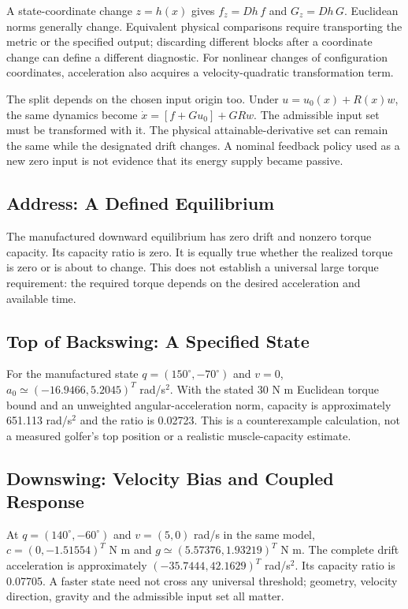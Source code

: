 A state-coordinate change $z=h(x)$ gives $f_z=Dh\,f$ and $G_z=Dh\,G$. Euclidean norms generally change. Equivalent physical comparisons require transporting the metric or the specified output; discarding different blocks after a coordinate change can define a different diagnostic. For nonlinear changes of configuration coordinates, acceleration also acquires a velocity-quadratic transformation term.

The split depends on the chosen input origin too. Under $u=u_0(x)+R(x)w$, the same dynamics become $\dot x=[f+Gu_0]+GRw$. The admissible input set must be transformed with it. The physical attainable-derivative set can remain the same while the designated drift changes. A nominal feedback policy used as a new zero input is not evidence that its energy supply became passive.

\subsection*{Address: A Defined Equilibrium}
The manufactured downward equilibrium has zero drift and nonzero torque capacity. Its capacity ratio is zero. It is equally true whether the realized torque is zero or is about to change. This does not establish a universal large torque requirement: the required torque depends on the desired acceleration and available time.

\subsection*{Top of Backswing: A Specified State}
For the manufactured state $q=(150^\circ,-70^\circ)$ and $v=0$, $a_0\simeq(-16.9466,5.2045)^T$ rad/s$^2$. With the stated 30 N m Euclidean torque bound and an unweighted angular-acceleration norm, capacity is approximately 651.113 rad/s$^2$ and the ratio is 0.02723. This is a counterexample calculation, not a measured golfer's top position or a realistic muscle-capacity estimate.

\subsection*{Downswing: Velocity Bias and Coupled Response}
At $q=(140^\circ,-60^\circ)$ and $v=(5,0)$ rad/s in the same model, $c=(0,-1.51554)^T$ N m and $g\simeq(5.57376,1.93219)^T$ N m. The complete drift acceleration is approximately $(-35.7444,42.1629)^T$ rad/s$^2$. Its capacity ratio is 0.07705. A faster state need not cross any universal threshold; geometry, velocity direction, gravity and the admissible input set all matter.

